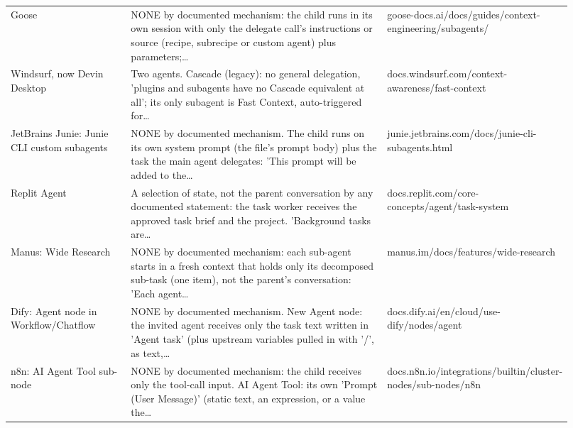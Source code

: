 \begin{longtable}{p{0.22\linewidth}p{0.5\linewidth}p{0.2\linewidth}}
Goose & NONE by documented mechanism: the child runs in its own session with only the delegate call's instructions or source (recipe, subrecipe or custom agent) plus parameters;\ldots & goose-\allowbreak{}docs.\allowbreak{}ai/\allowbreak{}docs/\allowbreak{}guides/\allowbreak{}context-\allowbreak{}engineering/\allowbreak{}subagents/\allowbreak{} \\
Windsurf, now Devin Desktop & Two agents.\allowbreak{} Cascade (legacy): no general delegation, 'plugins and subagents have no Cascade equivalent at all'; its only subagent is Fast Context, auto-\allowbreak{}triggered for\ldots & docs.\allowbreak{}windsurf.\allowbreak{}com/\allowbreak{}context-\allowbreak{}awareness/\allowbreak{}fast-\allowbreak{}context \\
JetBrains Junie: Junie CLI custom subagents & NONE by documented mechanism.\allowbreak{} The child runs on its own system prompt (the file's prompt body) plus the task the main agent delegates: 'This prompt will be added to the\ldots & junie.\allowbreak{}jetbrains.\allowbreak{}com/\allowbreak{}docs/\allowbreak{}junie-\allowbreak{}cli-\allowbreak{}subagents.\allowbreak{}html \\
Replit Agent & A selection of state, not the parent conversation by any documented statement: the task worker receives the approved task brief and the project.\allowbreak{} 'Background tasks are\ldots & docs.\allowbreak{}replit.\allowbreak{}com/\allowbreak{}core-\allowbreak{}concepts/\allowbreak{}agent/\allowbreak{}task-\allowbreak{}system \\
Manus: Wide Research & NONE by documented mechanism: each sub-\allowbreak{}agent starts in a fresh context that holds only its decomposed sub-\allowbreak{}task (one item), not the parent's conversation: 'Each agent\ldots & manus.\allowbreak{}im/\allowbreak{}docs/\allowbreak{}features/\allowbreak{}wide-\allowbreak{}research \\
Dify: Agent node in Workflow/\allowbreak{}Chatflow & NONE by documented mechanism.\allowbreak{} New Agent node: the invited agent receives only the task text written in 'Agent task' (plus upstream variables pulled in with '/\allowbreak{}', as text,\ldots & docs.\allowbreak{}dify.\allowbreak{}ai/\allowbreak{}en/\allowbreak{}cloud/\allowbreak{}use-\allowbreak{}dify/\allowbreak{}nodes/\allowbreak{}agent \\
n8n: AI Agent Tool sub-\allowbreak{}node & NONE by documented mechanism: the child receives only the tool-\allowbreak{}call input.\allowbreak{} AI Agent Tool: its own 'Prompt (User Message)' (static text, an expression, or a value the\ldots & docs.\allowbreak{}n8n.\allowbreak{}io/\allowbreak{}integrations/\allowbreak{}builtin/\allowbreak{}cluster-\allowbreak{}nodes/\allowbreak{}sub-\allowbreak{}nodes/\allowbreak{}n8n \\
\bottomrule
\end{longtable}
